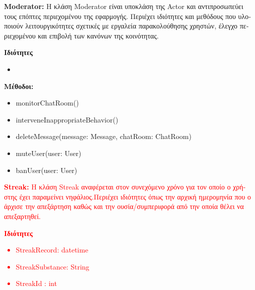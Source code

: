 \documentclass{article}
\begin{document}
\textbf{Moderator:} \textgreek{Η κλάση} Moderator \textgreek{είναι υποκλάση της} Actor \textgreek{και αντιπροσωπεύει τους επόπτες περιεχομένου της εφαρμογής. Περιέχει ιδιότητες και μεθόδους που υλοποιούν λειτουργικότητες σχετικές με εργαλεία παρακολούθησης χρηστών, έλεγχο περιεχομένου και επιβολή των κανόνων της κοινότητας.}
\newline
\newline

\textbf{\textgreek{Ιδιότητες}}
\begin{itemize}
    \item
\end{itemize}
\textbf{\textgreek{Μέθοδοι:}}
\begin{itemize}
    \item monitorChatRoom()
    \item interveneInappropriateBehavior()
    \item deleteMessage(message: Message, chatRoom: ChatRoom)
    \item muteUser(user: User)
    \item banUser(user: User)
\end{itemize}

\textcolor{red}{\textbf{Streak:} \textgreek{Η κλάση} Streak \textgreek{αναφέρεται στον συνεχόμενο χρόνο για τον οποίο ο χρήστης έχει παραμείνει νηφάλιος.Περιέχει ιδιότητες όπως την αρχική ημερομηνία που ο άρχισε την απεξάρτηση καθώς και την ουσία/συμπεριφορά από την οποία θέλει να απεξαρτηθεί.}}
\newline
\newline

\textcolor{red}{\textbf{\textgreek{Ιδιότητες}}
\begin{itemize}
    \item StreakRecord: datetime
    \item StreakSubstance: String
    \item StreakId : int
\end{itemize}}
\end{document}

